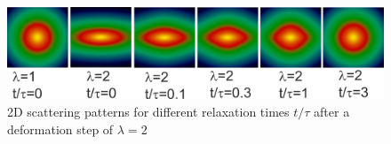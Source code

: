 \begin{figure}[htb]
\begin{center}
\includegraphics[width=\textwidth]{../images/form_factor/reptating_chain/lambda_2_reptating_chains.png}
\end{center}
\caption{2D scattering patterns for different relaxation times $t/\tau$ after a deformation step of $\lambda=2$}
\label{fig:IQ2Dstretchedpolymermelt}
\end{figure}

\newpage
